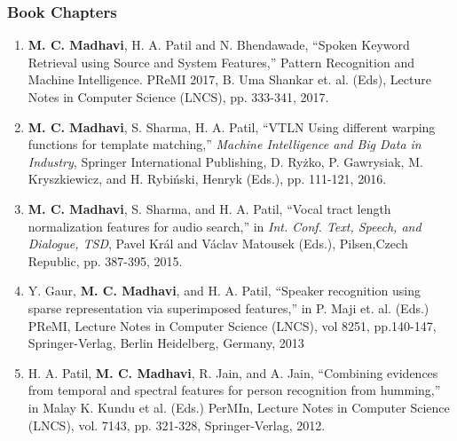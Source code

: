 \documentclass[10pt]{article}
\begin{document}
\subsubsection*{Book Chapters}
\begin{enumerate}[resume]
				\setlength\itemsep{-0.05em}
	\item \textbf{M. C. Madhavi}, H. A. Patil and N. Bhendawade, ``Spoken Keyword Retrieval using Source and System Features,''  Pattern Recognition and Machine Intelligence. PReMI 2017,  B. Uma Shankar et. al. (Eds), Lecture Notes in Computer Science (LNCS), pp. 333-341, 2017. 
	\item 	\textbf{M. C. Madhavi}, S. Sharma, H. A. Patil, ``VTLN Using different warping functions for template matching,'' \textit{Machine Intelligence and Big Data in Industry}, Springer International Publishing,  D. Ry{\.{z}}ko, P. Gawrysiak, M. Kryszkiewicz, and H. Rybi{\'{n}}ski, Henryk (Eds.),  pp. 111-121, 2016. 
	\item \textbf{M. C. Madhavi}, S. Sharma, and H. A. Patil, ``Vocal tract length normalization features for audio search,'' in \textit{Int. Conf. Text, Speech, and Dialogue, TSD}, {Pavel Kr{\'{a}}l and V{\'{a}}clav Matousek} (Eds.), Pilsen,Czech Republic, pp. 387-395, 2015.
	\item Y. Gaur, \textbf{M. C. Madhavi}, and H. A. Patil, ``Speaker recognition using sparse representation via superimposed features,'' in P. Maji et. al. (Eds.) PReMI, Lecture Notes in Computer Science (LNCS), vol 8251, pp.140-147, Springer-Verlag, Berlin Heidelberg, Germany, 2013
	\item  H. A. Patil, \textbf{M. C. Madhavi}, R. Jain, and A.  Jain, ``Combining evidences from temporal and spectral features for person recognition from humming,'' in Malay K. Kundu et al. (Eds.) PerMIn, Lecture Notes in Computer Science (LNCS), vol. 7143, pp. 321-328, Springer-Verlag, 2012. 
\end{enumerate}
\end{document}
